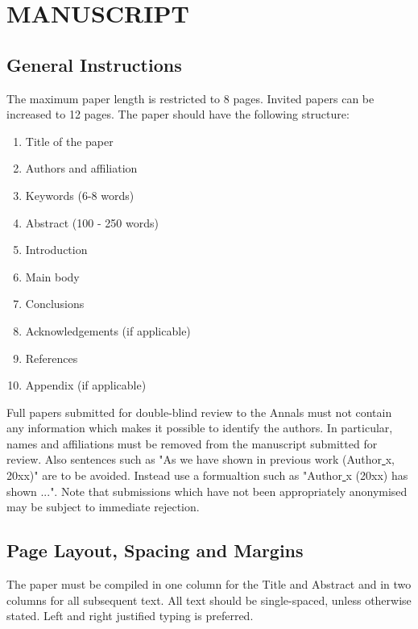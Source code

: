 \documentclass{isprs}
\begin{document}

\section{MANUSCRIPT}\label{MANUSCRIPT}

\subsection{General Instructions}\label{sec:General Instructions}

The maximum paper length is restricted to 8 pages. Invited papers can be increased to 12 pages. The paper should have the following structure: 

\begin{enumerate}
\setlength\itemsep{0em}\setlength\parskip{0em}\setlength\topsep{0em}\setlength\partopsep{0em}\setlength\parsep{0em} 
\item{Title of the paper} 
\item{Authors and affiliation}
\item{Keywords (6-8 words)}
\item{Abstract (100 - 250 words)}
\item{Introduction}
\item{Main body}
\item{Conclusions}
\item{Acknowledgements (if applicable)}
\item{References}
\item{Appendix (if applicable)}
\end{enumerate}

Full papers submitted for double-blind review to the Annals must not contain any information 
which makes it possible to identify the authors. In particular, names and affiliations must be 
removed from the manuscript submitted for review. Also sentences such as "As we have shown in 
previous work (Author\underline{ }x, 20xx)" are to be avoided. Instead use a formualtion such 
as "Author\underline{ }x (20xx) has shown ...". Note that submissions which have not been 
appropriately anonymised may be subject to immediate rejection.

\subsection{Page Layout, Spacing and Margins}\label{sec:Page Layout, Spacing and Margins}

The paper must be compiled in one column for the Title and Abstract and in two columns for all subsequent text. 
All text should be single-spaced, unless otherwise stated. Left and right justified typing is preferred.
\end{document}
